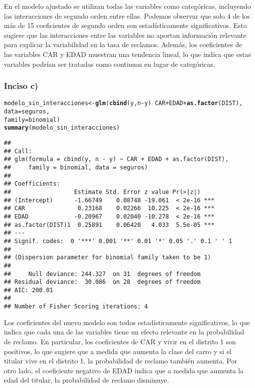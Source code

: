 \documentclass[paper=letter, fontsize=11pt, draft=false]{scrartcl}\usepackage[]{graphicx}\usepackage[]{xcolor}
\makeatletter
\newcommand{\hlopt}[1]{\textcolor[rgb]{0,0,0}{#1}}%
\newcommand{\hldef}[1]{\textcolor[rgb]{0.345,0.345,0.345}{#1}}%
\newcommand{\hlkwb}[1]{\textcolor[rgb]{0.69,0.353,0.396}{#1}}%
\newcommand{\hlkwc}[1]{\textcolor[rgb]{0.333,0.667,0.333}{#1}}%
\newcommand{\hlkwd}[1]{\textcolor[rgb]{0.737,0.353,0.396}{\textbf{#1}}}%
\newenvironment{kframe}{%
 \def\at@end@of@kframe{}%
 \ifinner\ifhmode%
  \def\at@end@of@kframe{\end{minipage}}%
  \begin{minipage}{\columnwidth}%
 \fi\fi%
 \def\FrameCommand##1{\hskip\@totalleftmargin \hskip-\fboxsep
 \colorbox{shadecolor}{##1}\hskip-\fboxsep
     \hskip-\linewidth \hskip-\@totalleftmargin \hskip\columnwidth}%
 \MakeFramed {\advance\hsize-\width
   \@totalleftmargin\z@ \linewidth\hsize
   \@setminipage}}%
 {\par\unskip\endMakeFramed%
 \at@end@of@kframe}
\newenvironment{knitrout}{}{} %
\numberwithin{equation}{problemcounter} %
\numberwithin{figure}{problemcounter} %
\numberwithin{table}{problemcounter} %
\numberwithin{subsection}{problemcounter}
\makeatother
\begin{document}
En el modelo ajustado se utilizan todas las variables como categóricas, incluyendo las interacciones de segundo orden entre ellas. Podemos observar que solo 4 de los más de 15 coeficientes de segundo orden son estadísticamente significativos. Esto sugiere que las interacciones entre las variables no aportan información relevante para explicar la variabilidad en la tasa de reclamos. Además, los coeficientes de las variables CAR y EDAD muestran una tendencia lineal, lo que indica que estas variables podrían ser tratadas como continuas en lugar de categóricas.

\subsubsection*{Inciso c)}
\begin{knitrout}
\color{fgcolor}\begin{kframe}
\begin{alltt}
\hldef{modelo_sin_interacciones} \hlkwb{<-} \hlkwd{glm}\hldef{(}\hlkwd{cbind}\hldef{(y, n} \hlopt{-} \hldef{y)} \hlopt{~} \hldef{CAR} \hlopt{+} \hldef{EDAD} \hlopt{+} \hlkwd{as.factor}\hldef{(DIST),}
                                 \hlkwc{data} \hldef{= seguros,}
                                 \hlkwc{family} \hldef{= binomial)}
\hlkwd{summary}\hldef{(modelo_sin_interacciones)}
\end{alltt}
\begin{verbatim}
## 
## Call:
## glm(formula = cbind(y, n - y) ~ CAR + EDAD + as.factor(DIST), 
##     family = binomial, data = seguros)
## 
## Coefficients:
##                  Estimate Std. Error z value Pr(>|z|)    
## (Intercept)      -1.66749    0.08748 -19.061  < 2e-16 ***
## CAR               0.23168    0.02266  10.225  < 2e-16 ***
## EDAD             -0.20967    0.02040 -10.278  < 2e-16 ***
## as.factor(DIST)1  0.25891    0.06420   4.033  5.5e-05 ***
## ---
## Signif. codes:  0 '***' 0.001 '**' 0.01 '*' 0.05 '.' 0.1 ' ' 1
## 
## (Dispersion parameter for binomial family taken to be 1)
## 
##     Null deviance: 244.327  on 31  degrees of freedom
## Residual deviance:  30.086  on 28  degrees of freedom
## AIC: 200.01
## 
## Number of Fisher Scoring iterations: 4
\end{verbatim}
\end{kframe}
\end{knitrout}

Los coeficientes del nuevo modelo son todos estadísticamente significativos, lo que indica que cada una de las variables tiene un efecto relevante en la probabilidad de reclamo. En particular, los coeficientes de CAR y vivir en el distrito 1 son positivos, lo que sugiere que a medida que aumenta la clase del carro y si el titular vive en el distrito 1, la probabilidad de reclamo también aumenta. Por otro lado, el coeficiente negativo de EDAD indica que a medida que aumenta la edad del titular, la probabilidad de reclamo disminuye.
\end{document}
